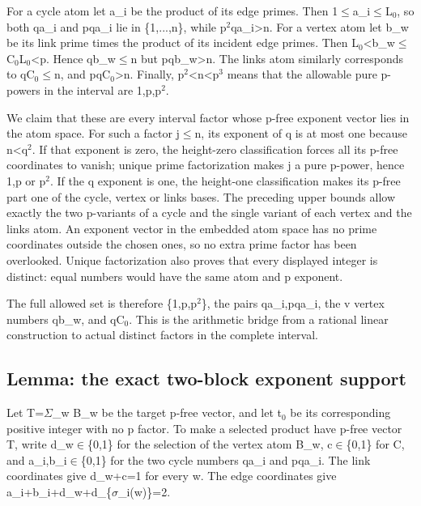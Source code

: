 \documentclass[11pt,a4paper]{article}
\begin{document}
For a cycle atom let a\_i be the product of its edge primes. Then 1\ensuremath{\leq}a\_i\ensuremath{\leq}L\ensuremath{_0}, so both qa\_i and pqa\_i lie in \{1,...,n\}, while p\ensuremath{^2}qa\_i>n. For a vertex atom let b\_w be its link prime times the product of its incident edge primes. Then L\ensuremath{_0}<b\_w\ensuremath{\leq}C\ensuremath{_0}L\ensuremath{_0}<p. Hence qb\_w\ensuremath{\leq}n but pqb\_w>n. The links atom similarly corresponds to qC\ensuremath{_0}\ensuremath{\leq}n, and pqC\ensuremath{_0}>n. Finally, p\ensuremath{^2}<n<p\ensuremath{^3} means that the allowable pure p-powers in the interval are 1,p,p\ensuremath{^2}.

We claim that these are every interval factor whose p-free exponent vector lies in the atom space. For such a factor j\ensuremath{\leq}n, its exponent of q is at most one because n<q\ensuremath{^2}. If that exponent is zero, the height-zero classification forces all its p-free coordinates to vanish; unique prime factorization makes j a pure p-power, hence 1,p or p\ensuremath{^2}. If the q exponent is one, the height-one classification makes its p-free part one of the cycle, vertex or links bases. The preceding upper bounds allow exactly the two p-variants of a cycle and the single variant of each vertex and the links atom. An exponent vector in the embedded atom space has no prime coordinates outside the chosen ones, so no extra prime factor has been overlooked. Unique factorization also proves that every displayed integer is distinct: equal numbers would have the same atom and p exponent.

The full allowed set is therefore \{1,p,p\ensuremath{^2}\}, the pairs qa\_i,pqa\_i, the v vertex numbers qb\_w, and qC\ensuremath{_0}. This is the arithmetic bridge from a rational linear construction to actual distinct factors in the complete interval.

\subsection{Lemma: the exact two-block exponent support}
Let T=\ensuremath{\Sigma}\_w B\_w be the target p-free vector, and let t\ensuremath{_0} be its corresponding positive integer with no p factor. To make a selected product have p-free vector T, write d\_w\ensuremath{\in}\{0,1\} for the selection of the vertex atom B\_w, c\ensuremath{\in}\{0,1\} for C, and a\_i,b\_i\ensuremath{\in}\{0,1\} for the two cycle numbers qa\_i and pqa\_i. The link coordinates give d\_w+c=1 for every w. The edge coordinates give a\_i+b\_i+d\_w+d\_\{\ensuremath{\sigma}\_i(w)\}=2.
\end{document}
